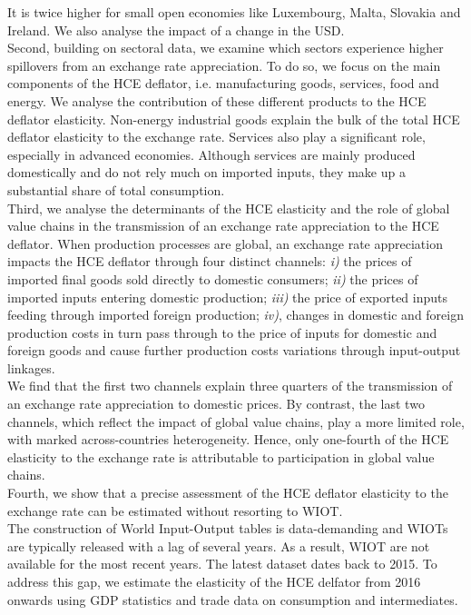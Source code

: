 \documentclass[12pt,a4paper]{article}
\begin{document}
It is twice higher for small open economies like Luxembourg, Malta, Slovakia and Ireland.
We also analyse the impact of a change in the USD. \\
Second, building on sectoral data, we examine which sectors experience higher spillovers from an exchange rate appreciation. 
To do so, we focus on the main components of the HCE deflator, i.e. manufacturing goods, services, food and energy. 
We analyse the contribution of these different products to the HCE deflator elasticity.
Non-energy industrial goods explain the bulk of the total HCE deflator elasticity to the exchange rate. 
Services also play a significant role, especially in advanced economies. 
Although services are mainly produced domestically and do not rely much on imported inputs, they make up a substantial share of total consumption. \\
Third, we analyse the determinants of the HCE elasticity and the role of global value chains in the transmission of an exchange rate appreciation to the HCE deflator. 
When production processes are global, an exchange rate appreciation impacts the HCE deflator through four distinct channels: \textit{i)} the prices of imported ﬁnal goods sold directly to domestic consumers;
\textit{ii)} the prices of imported inputs entering domestic production; 
\textit{iii)} the price of exported inputs feeding through imported foreign production;
\textit{iv)}, changes in domestic and foreign production costs in turn pass through to the price of inputs for domestic and foreign goods and cause further production costs variations through input-output linkages.\\
We find that the first two channels explain three quarters of the transmission of an exchange rate appreciation to domestic prices.
By contrast, the last two channels, which reflect the impact of global value chains, play a more limited role, with marked across-countries heterogeneity.
Hence, only one-fourth of the HCE elasticity to the exchange rate is attributable to participation in global value chains.\\
Fourth, we show that a precise assessment of the HCE deflator elasticity to the exchange rate can be estimated without resorting to WIOT. \\
The construction of World Input-Output tables is data-demanding and WIOTs are typically released with a lag of several years.
As a result, WIOT are not available for the most recent years. The latest dataset dates back to 2015. 
To address this gap, we estimate the elasticity of the HCE delfator from 2016 onwards using GDP statistics and trade data on consumption and intermediates.\\
\end{document}
